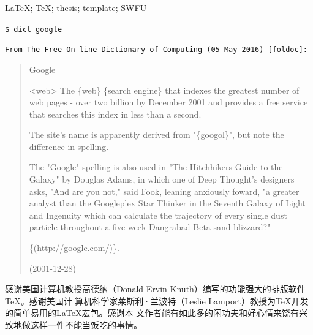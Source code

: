 \documentclass{swfuthesis}
\begin{document}
\begin{EKeyword} %
  \LaTeX{}; \TeX{}; thesis; template; SWFU
\end{EKeyword}

\vspace*{-60pt}
\tableofcontents %
\clearpage
\listoffigures %
\clearpage
\listoftables  %

\mainmatter






\appendix %

\makebib %

\begin{advisorInfo} %
\noindent{}\texttt{{\large \$ dict google}}
  \begin{singlespace}
    \noindent{}\texttt{From The Free On-line Dictionary of Computing (05 May 2016) [foldoc]:}

    \begin{quote}
      {\ttfamily \hspace{-2em}Google
    
        <web> The \{web\} \{search engine\} that indexes the greatest number of web pages
        - over two billion by December 2001 and provides a free service that searches this
        index in less than a second.
  
        The site's name is apparently derived from "\{googol\}", but note the difference
        in spelling.
  
        The "Google" spelling is also used in "The Hitchhikers Guide to the Galaxy" by
        Douglas Adams, in which one of Deep Thought's designers asks, "And are you not,"
        said Fook, leaning anxiously foward, "a greater analyst than the Googleplex Star
        Thinker in the Seventh Galaxy of Light and Ingenuity which can calculate the
        trajectory of every single dust particle throughout a five-week Dangrabad Beta
        sand blizzard?"
      
        \{(http://google.com/)\}.
      
        (2001-12-28) }
    \end{quote}
  \end{singlespace}
\end{advisorInfo}

\begin{acknowledgment} %
  感谢美国计算机教授高德纳（Donald Ervin Knuth）编写的功能强大的排版软件\TeX{}。感谢美国计
  算机科学家莱斯利·兰波特（Leslie Lamport）教授为\TeX{}开发的简单易用的\LaTeX{}宏包。感谢本
  文作者能有如此多的闲功夫和好心情来饶有兴致地做这样一件不能当饭吃的事情。
\end{acknowledgment}
\end{document}
